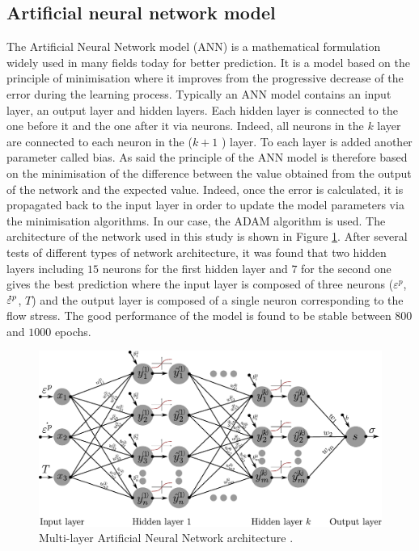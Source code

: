 \documentclass[twoside,english,1p,final,sort&compress]{elsarticle}
\theoremstyle{plain}
\newcommand{\mdot}[1]{\accentset{\mbox{\bfseries .}}{#1}}
\begin{document}
\subsection{Artificial neural network model\label{sec:ANNmodel}}
The Artificial Neural Network model (ANN) is a mathematical formulation widely used in many fields today for better prediction. It is a model based on the principle of minimisation where it improves from the progressive decrease of the error during the learning process. Typically an ANN model contains an input layer, an output layer and hidden layers. Each hidden layer is connected to the one before it and the one after it via neurons. Indeed, all neurons in the $k$ layer are connected to each neuron in the ($k+1$ ) layer. To each layer is added another parameter called bias. As said the principle of the ANN model is therefore based on the minimisation of the difference between the value obtained from the output of the network and the expected value.  Indeed, once the error is calculated, it is propagated back to the input layer in order to update the model parameters via the minimisation algorithms. In our case, the ADAM algorithm is used. The architecture of the network used in this study is shown in Figure \ref{fig:ANN-scheme-2HL}. After several tests of different types of network architecture, it was found that two hidden layers including $15$ neurons for the first hidden layer and $7$ for the second one gives the best prediction where the input layer is composed of three neurons ($\varepsilon^p$, $\mdot{\varepsilon}^p$, $T$) and the output layer is composed of a single neuron corresponding to the flow stress. The good performance of the model is found to be stable between $800$ and $1000$ epochs.

\begin{figure}[!ht]
\centering
\includegraphics[width=0.9\columnwidth]
{newFigures/ANN-scheme-2HL}
\caption{Multi-layer Artificial Neural Network architecture \cite{OPantale-2021-LGP}.}
\label{fig:ANN-scheme-2HL}
\end{figure}
\end{document}
